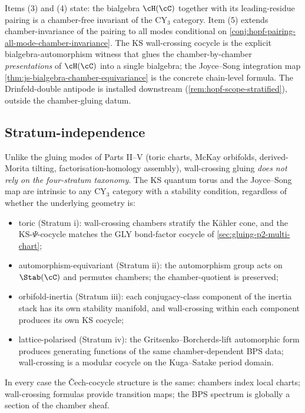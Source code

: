 Items (3) and (4) state: the bialgebra $\cH(\cC)$ together with its
leading-residue pairing is a chamber-free invariant of the CY$_3$
category. Item (5) extends chamber-invariance of the pairing to all
modes conditional on
\cref{conj:hopf-pairing-all-mode-chamber-invariance}.
The KS wall-crossing cocycle is the explicit bialgebra-automorphism
witness that glues the chamber-by-chamber \emph{presentations} of
$\cH(\cC)$ into a single bialgebra; the Joyce--Song integration map
\cref{thm:js-bialgebra-chamber-equivariance} is the concrete chain-level
formula. The Drinfeld-double antipode is installed downstream
(\cref{rem:hopf-scope-stratified}), outside the chamber-gluing
datum.

\subsection{Stratum-independence}
\label{sec:wc-stratum-independence}

Unlike the gluing modes of Parts II--V (toric charts, McKay orbifolds,
derived-Morita tilting, factorisation-homology assembly), wall-crossing
gluing \emph{does not rely on the four-stratum taxonomy}. The KS quantum
torus and the Joyce--Song map are intrinsic to any CY$_3$ category with a
stability condition, regardless of whether the underlying geometry is:

\begin{itemize}[leftmargin=2em]
 \item toric (Stratum i): wall-crossing chambers stratify the K\"ahler
 cone, and the KS-$\Psi$-cocycle matches the GLY bond-factor cocycle
 of \cref{sec:gluing-p2-multi-chart};
 \item automorphism-equivariant (Stratum ii): the automorphism group acts
 on $\Stab(\cC)$ and permutes chambers; the chamber-quotient is
 preserved;
 \item orbifold-inertia (Stratum iii): each conjugacy-class component of
 the inertia stack has its own stability manifold, and wall-crossing
 within each component produces its own KS cocycle;
 \item lattice-polarised (Stratum iv): the Gritsenko--Borcherds-lift
 automorphic form produces generating functions of the same
 chamber-dependent BPS data; wall-crossing is a modular cocycle on
 the Kuga--Satake period domain.
\end{itemize}

In every case the \v{C}ech-cocycle structure is the same: chambers index
local charts; wall-crossing formulas provide transition maps; the BPS
spectrum is globally a section of the chamber sheaf.


